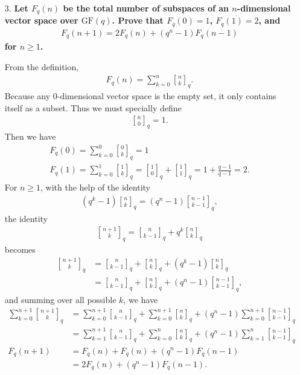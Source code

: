 \documentclass[a4paper,12pt]{article}
\newcommand{\gbinom}[2]{\genfrac{[}{]}{0pt}{}{#1}{#2}}
\begin{document}
\begin{enumerate}
    \item[3.]
        \boldmath
        \textbf{Let $F_q(n)$ be the total number of subspaces of an $n$-dimensional vector space over $\text{GF}(q)$. Prove that $F_q(0) = 1$, $F_q(1) = 2$, and
        \begin{align*}
            F_q(n + 1) = 2F_q(n) + (q^n - 1) F_q(n - 1)
        \end{align*}
        for $n \geq 1$.} \par
        \unboldmath
        From the definition,
        \begin{align*}
            F_q(n) = \sum_{k = 0}^n \gbinom{n}{k}_q.
        \end{align*}
        Because any $0$-dimensional vector space is the empty set, it only contains itself as a subset. Thus we must specially define
        \begin{align*}
            \gbinom{n}{0}_q = 1.
        \end{align*}
        Then we have
        \begin{gather*}
            F_q(0) = \sum_{k = 0}^0 \gbinom{0}{k}_q = 1 \\
            F_q(1) = \sum_{k = 0}^1 \gbinom{1}{k}_q = \gbinom{1}{0}_q + \gbinom{1}{1}_q = 1 + \frac{q - 1}{q - 1} = 2.
        \end{gather*}
        For $n \geq 1$, with the help of the identity
        \begin{gather}
            (q^k - 1) \gbinom{n}{k}_q = (q^n - 1) \gbinom{n - 1}{k - 1}_q,
        \end{gather}
        the identity
        \begin{gather}
            \gbinom{n + 1}{k}_q = \gbinom{n}{k - 1}_q + q^k \gbinom{n}{k}_q
        \end{gather}
        becomes
        \begin{align*}
            \gbinom{n + 1}{k}_q &= \gbinom{n}{k - 1}_q + \gbinom{n}{k}_q + (q^k - 1) \gbinom{n}{k}_q \\
            &= \gbinom{n}{k - 1}_q + \gbinom{n}{k}_q + (q^n - 1) \gbinom{n - 1}{k - 1}_q,
        \end{align*}
        and summing over all possible $k$, we have
        \begin{align*}
            \sum_{k = 0}^{n + 1} \gbinom{n + 1}{k}_q &= \sum_{k = 0}^{n + 1} \gbinom{n}{k - 1}_q + \sum_{k = 0}^{n + 1} \gbinom{n}{k}_q + (q^n - 1) \sum_{k = 0}^{n + 1} \gbinom{n - 1}{k - 1}_q \\
            &= \sum_{k = 1}^{n + 1} \gbinom{n}{k - 1}_q + \sum_{k = 0}^n \gbinom{n}{k}_q + (q^n - 1) \sum_{k = 1}^{n} \gbinom{n - 1}{k - 1}_q \\
            F_q(n + 1) &= F_q(n) + F_q(n) + (q^n - 1) F_q(n - 1) \\
            &= 2F_q(n) + (q^n - 1) F_q(n - 1).
        \end{align*}


\end{enumerate}
\end{document}
